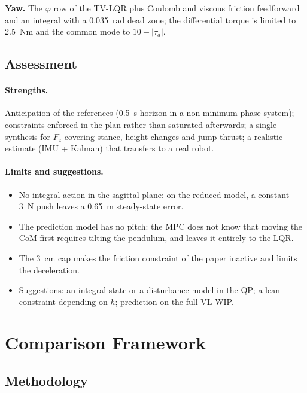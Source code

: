 \documentclass[11pt,a4paper]{article}
\begin{document}
\textbf{Yaw.}  The $\varphi$ row of the TV-LQR plus Coulomb and viscous friction feedforward and
an integral with a 0.035~rad dead zone; the differential torque is limited to 2.5~Nm and the
common mode to $10 - |\tau_d|$.

\subsection{Assessment}

\paragraph{Strengths.}  Anticipation of the references (0.5~s horizon in a non-minimum-phase
system); constraints enforced in the plan rather than saturated afterwards; a single synthesis
for $F_z$ covering stance, height changes and jump thrust; a realistic estimate (IMU + Kalman)
that transfers to a real robot.

\paragraph{Limits and suggestions.}
\begin{itemize}[leftmargin=*]
    \item No integral action in the sagittal plane: on the reduced model, a constant 3~N push
          leaves a 0.65~m steady-state error.
    \item The prediction model has no pitch: the MPC does not know that moving the CoM first
          requires tilting the pendulum, and leaves it entirely to the LQR.
    \item The 3~cm cap makes the friction constraint of the paper inactive and limits the
          deceleration.
    \item Suggestions: an integral state or a disturbance model in the QP; a lean constraint
          depending on $h$; prediction on the full VL-WIP.
\end{itemize}


\section{Comparison Framework}
\label{sec:comparison}

\subsection{Methodology}
\end{document}
